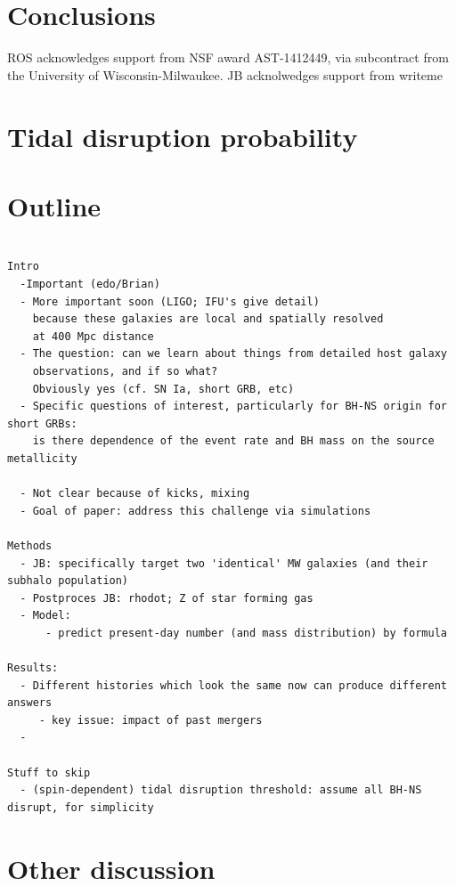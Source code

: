 \documentclass[nofootinbib,twocolumn,prd]{emulateapj}
\newcommand\editremark[1]{{\color{red}#1}}
\begin{document}
\section{Conclusions}





\begin{acknowledgements}
ROS acknowledges support from NSF award AST-1412449, via subcontract from the University of Wisconsin-Milwaukee.
%
JB acknolwedges support  from \editremark{writeme}
\end{acknowledgements}

\appendix
\section{Tidal disruption probability}

\section{Outline }
\begin{verbatim}

Intro
  -Important (edo/Brian)
  - More important soon (LIGO; IFU's give detail)
    because these galaxies are local and spatially resolved
    at 400 Mpc distance
  - The question: can we learn about things from detailed host galaxy 
    observations, and if so what?
    Obviously yes (cf. SN Ia, short GRB, etc)
  - Specific questions of interest, particularly for BH-NS origin for short GRBs:
    is there dependence of the event rate and BH mass on the source metallicity

  - Not clear because of kicks, mixing
  - Goal of paper: address this challenge via simulations

Methods
  - JB: specifically target two 'identical' MW galaxies (and their subhalo population)
  - Postproces JB: rhodot; Z of star forming gas
  - Model:
      - predict present-day number (and mass distribution) by formula 

Results:
  - Different histories which look the same now can produce different answers
     - key issue: impact of past mergers
  - 

Stuff to skip
  - (spin-dependent) tidal disruption threshold: assume all BH-NS disrupt, for simplicity
\end{verbatim}


\section{Other discussion}
\end{document}
